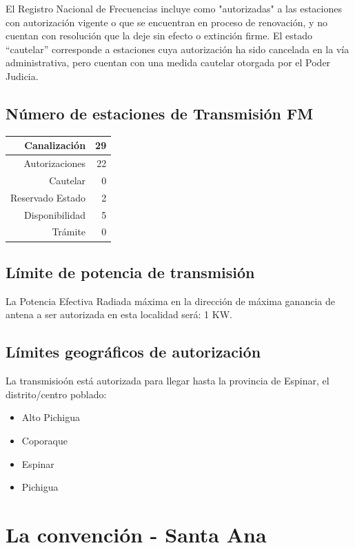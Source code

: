 \documentclass[11pt]{article}
\begin{document}
El Registro Nacional de Frecuencias incluye como "autorizadas" a las estaciones con autorización vigente o que se encuentran en proceso de renovación, y no cuentan con resolución que la deje sin efecto o extinción firme. El estado “cautelar” corresponde a estaciones cuya autorización ha sido cancelada en la vía administrativa, pero cuentan con una medida cautelar otorgada por el Poder Judicia.

\subsection{Número de estaciones de Transmisión FM}

\begin{tabular}{|r|r|} \hline
	Canalización 			& 29 \\ \hline
	Autorizaciones			& 22 \\ \hline
	Cautelar				& 0 \\ \hline
	Reservado Estado		& 2 \\ \hline
	Disponibilidad			& 5 \\ \hline
	Trámite					& 0 \\ \hline 
\end{tabular}

\subsection{Límite de potencia de transmisión}

La Potencia Efectiva Radiada máxima en la dirección de máxima ganancia de antena a ser autorizada en esta localidad será: 1 KW.

\subsection{Límites geográficos de autorización}

La transmisioón está autorizada para llegar hasta la provincia de Espinar, el distrito/centro poblado:

\begin{itemize}
	\item Alto Pichigua
	\item Coporaque
	\item Espinar
	\item Pichigua
\end{itemize}



\section{La convención - Santa Ana}
\end{document}
